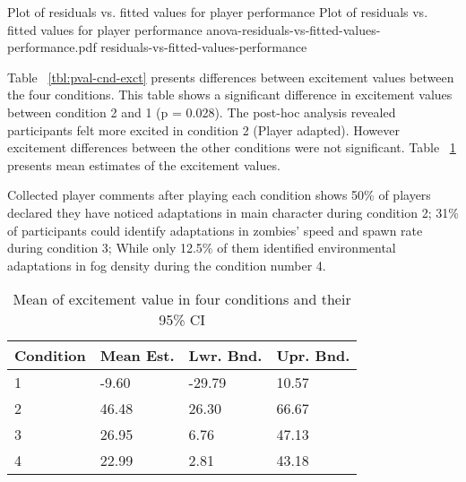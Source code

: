 \documentclass[conference]{IEEEtran}
\begin{document}
\img
{Plot of residuals vs. fitted values for player performance}
{Plot of residuals vs. fitted values for player performance}
{anova-residuals-vs-fitted-values-performance.pdf}
{residuals-vs-fitted-values-performance}

Table ~\ref{tbl:pval-cnd-exct} presents differences between excitement values between the four conditions. This table shows a significant difference in excitement values between condition 2 and 1 (p = 0.028). The post-hoc analysis revealed participants felt more excited in condition 2 (Player adapted). However excitement differences between the other conditions were not significant. Table ~\ref{tbl:mean-cnd-exct} presents mean estimates of the excitement values. 

Collected player comments after playing each condition shows 50\% of players declared they have noticed adaptations in main character during condition 2; 31\% of participants could identify adaptations in zombies' speed and spawn rate during condition 3; While only 12.5\% of them identified environmental adaptations in fog density during the condition number 4. 

\begin{table}[h]
\caption{Mean of excitement value in four conditions and their 95\% CI}
\label{tbl:mean-cnd-exct}
\centering
\begin{tabular}{llll}
\hline
Condition      &   Mean Est.      &   Lwr. Bnd.    &  Upr. Bnd.     \\
\hline
1              &   -9.60          &   -29.79       &  10.57         \\
2              &   46.48          &   26.30        &  66.67         \\
3              &   26.95          &   6.76         &  47.13         \\
4              &   22.99          &   2.81         &  43.18         \\
\hline
\end{tabular}
\end{table}
\end{document}

